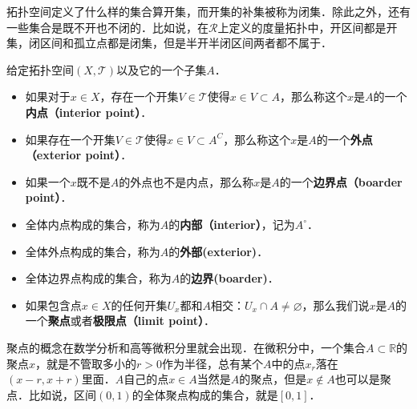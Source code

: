 
拓扑空间定义了什么样的集合算开集，而开集的补集被称为闭集．除此之外，还有一些集合是既不开也不闭的．比如说，在$\mathcal{R}$上定义的度量拓扑中，开区间都是开集，闭区间和孤立点都是闭集，但是半开半闭区间两者都不属于．

\begin{definition}{}
给定拓扑空间$(X, \mathcal{T})$以及它的一个子集$A$．
\begin{itemize}
\item 如果对于$x\in X$，存在一个开集$V\in \mathcal{T}$使得$x\in V\subset A$，那么称这个$x$是$A$的一个\textbf{内点（interior point）}．
\item 如果存在一个开集$V\in \mathcal{T}$使得$x\in V\subset A^C$，那么称这个$x$是$A$的一个\textbf{外点（exterior point）}．
\item 如果一个$x$既不是$A$的外点也不是内点，那么称$x$是$A$的一个\textbf{边界点（boarder point）}．

\item 全体内点构成的集合，称为$A$的\textbf{内部（interior）}，记为$A^\circ$．
\item 全体外点构成的集合，称为$A$的\textbf{外部(exterior)}．
\item 全体边界点构成的集合，称为$A$的\textbf{边界(boarder)}．
\item 如果包含点$x\in X$的任何开集$U_x$都和$A$相交：$U_x\cap A\not=\varnothing$，那么我们说$x$是$A$的一个\textbf{聚点}或者\textbf{极限点（limit point）}．
\end{itemize}
\end{definition}

聚点的概念在数学分析和高等微积分里就会出现．在微积分中，一个集合$A\subset\mathbb{R}$的聚点$x$，就是不管取多小的$r>0$作为半径，总有某个$A$中的点$x_r$落在$(x-r, x+r)$里面．$A$自己的点$x\in A$当然是$A$的聚点，但是$x\not\in A$也可以是聚点．比如说，区间$(0,1)$的全体聚点构成的集合，就是$[0,1]$．
